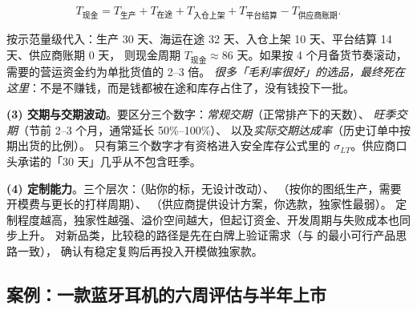 \begin{equation}
T_{\text{现金}} = T_{\text{生产}} + T_{\text{在途}} + T_{\text{入仓上架}} + T_{\text{平台结算}} - T_{\text{供应商账期}} .
\label{eq:cashcycle}
\end{equation}

按示范量级代入：生产 30 天、海运在途 32 天、入仓上架 10 天、平台结算 14 天、供应商账期 0 天，
则现金周期 $T_{\text{现金}} \approx 86$ 天。如果按 4 个月备货节奏滚动，需要的营运资金约为单批货值的 2--3 倍。
\emph{很多「毛利率很好」的选品，最终死在这里}：不是不赚钱，而是钱都被在途和库存占住了，没有钱投下一批。

\textbf{(3) 交期与交期波动}。要区分三个数字：\emph{常规交期}（正常排产下的天数）、
\emph{旺季交期}（节前 2--3 个月，通常延长 50\%--100\%）、
以及\emph{实际交期达成率}（历史订单中按期出货的比例）。
只有第三个数字才有资格进入安全库存公式里的 $\sigma_{LT}$。供应商口头承诺的「30 天」几乎从不包含旺季。

\textbf{(4) 定制能力}。三个层次：（贴你的标，无设计改动）、
（按你的图纸生产，需要开模费与更长的打样周期）、
（供应商提供设计方案，你选款，独家性最弱）。
定制程度越高，独家性越强、溢价空间越大，但起订资金、开发周期与失败成本也同步上升。
对新品类，比较稳的路径是先在白牌上验证需求（与 \cite{ries2011lean} 的最小可行产品思路一致），
确认有稳定复购后再投入开模做独家款。

\subsection{案例：一款蓝牙耳机的六周评估与半年上市}

